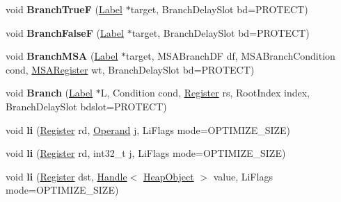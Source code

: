 \begin{DoxyCompactItemize}
void {\bfseries Branch\+TrueF} (\mbox{\hyperlink{classv8_1_1internal_1_1Label}{Label}} $\ast$target, Branch\+Delay\+Slot bd=P\+R\+O\+T\+E\+CT)
\item 
\mbox{\label{classv8_1_1internal_1_1TurboAssembler_aed17d42e54d69645717ae5630b619eda}} 
void {\bfseries Branch\+FalseF} (\mbox{\hyperlink{classv8_1_1internal_1_1Label}{Label}} $\ast$target, Branch\+Delay\+Slot bd=P\+R\+O\+T\+E\+CT)
\item 
\mbox{\label{classv8_1_1internal_1_1TurboAssembler_a894785d1d6f4b7b4c3d7171c3dfa376e}} 
void {\bfseries Branch\+M\+SA} (\mbox{\hyperlink{classv8_1_1internal_1_1Label}{Label}} $\ast$target, M\+S\+A\+Branch\+DF df, M\+S\+A\+Branch\+Condition cond, \mbox{\hyperlink{classv8_1_1internal_1_1MSARegister}{M\+S\+A\+Register}} wt, Branch\+Delay\+Slot bd=P\+R\+O\+T\+E\+CT)
\item 
\mbox{\label{classv8_1_1internal_1_1TurboAssembler_a0bade19fba087b116b6483c64750d086}} 
void {\bfseries Branch} (\mbox{\hyperlink{classv8_1_1internal_1_1Label}{Label}} $\ast$L, Condition cond, \mbox{\hyperlink{classv8_1_1internal_1_1Register}{Register}} rs, Root\+Index index, Branch\+Delay\+Slot bdslot=P\+R\+O\+T\+E\+CT)
\item 
\mbox{\label{classv8_1_1internal_1_1TurboAssembler_a4e389bd49edcc474e41b7303438325e7}} 
void {\bfseries li} (\mbox{\hyperlink{classv8_1_1internal_1_1Register}{Register}} rd, \mbox{\hyperlink{classv8_1_1internal_1_1Operand}{Operand}} j, Li\+Flags mode=O\+P\+T\+I\+M\+I\+Z\+E\+\_\+\+S\+I\+ZE)
\item 
\mbox{\label{classv8_1_1internal_1_1TurboAssembler_adae6a5d4f34297dbc0583e3a695bba29}} 
void {\bfseries li} (\mbox{\hyperlink{classv8_1_1internal_1_1Register}{Register}} rd, int32\+\_\+t j, Li\+Flags mode=O\+P\+T\+I\+M\+I\+Z\+E\+\_\+\+S\+I\+ZE)
\item 
\mbox{\label{classv8_1_1internal_1_1TurboAssembler_adef698dfe7f9e3d267588f0047b43ea4}} 
void {\bfseries li} (\mbox{\hyperlink{classv8_1_1internal_1_1Register}{Register}} dst, \mbox{\hyperlink{classv8_1_1internal_1_1Handle}{Handle}}$<$ \mbox{\hyperlink{classv8_1_1internal_1_1HeapObject}{Heap\+Object}} $>$ value, Li\+Flags mode=O\+P\+T\+I\+M\+I\+Z\+E\+\_\+\+S\+I\+ZE)

\end{DoxyCompactItemize}
